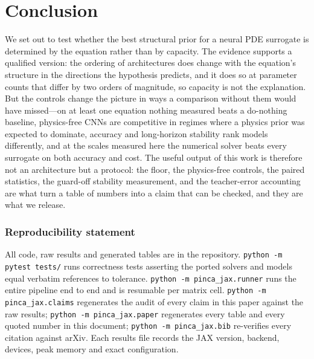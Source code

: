 \documentclass{article}
\newcommand{\code}[1]{\texttt{\small #1}}
\begin{document}
\section{Conclusion}

We set out to test whether the best structural prior for a neural PDE surrogate is
determined by the equation rather than by capacity. The evidence supports a qualified
version: the ordering of architectures does change with the equation's structure in the
directions the hypothesis predicts, and it does so at parameter counts that differ by two
orders of magnitude, so capacity is not the explanation. But the controls change the
picture in ways a comparison without them would have missed---on at least one equation
nothing measured beats a do-nothing baseline, physics-free CNNs are competitive in
regimes where a physics prior was expected to dominate, accuracy and long-horizon
stability rank models differently, and at the scales measured here the numerical solver
beats every surrogate on both accuracy and cost. The useful output of this work is
therefore not an architecture but a protocol: the floor, the physics-free controls, the
paired statistics, the guard-off stability measurement, and the teacher-error accounting
are what turn a table of numbers into a claim that can be checked, and they are what we
release.

\subsubsection*{Reproducibility statement}
All code, raw results and generated tables are in the repository. \code{python -m pytest
tests/} runs \Ntests{} correctness tests asserting the ported solvers and models equal
verbatim references to tolerance. \code{python -m pinca\_jax.runner} runs the entire
pipeline end to end and is resumable per matrix cell. \code{python -m pinca\_jax.claims}
regenerates the audit of every claim in this paper against the raw results; \code{python
-m pinca\_jax.paper} regenerates every table and every quoted number in this document;
\code{python -m pinca\_jax.bib} re-verifies every citation against arXiv. Each results
file records the JAX version, backend, devices, peak memory and exact configuration.




\appendix

\end{document}
